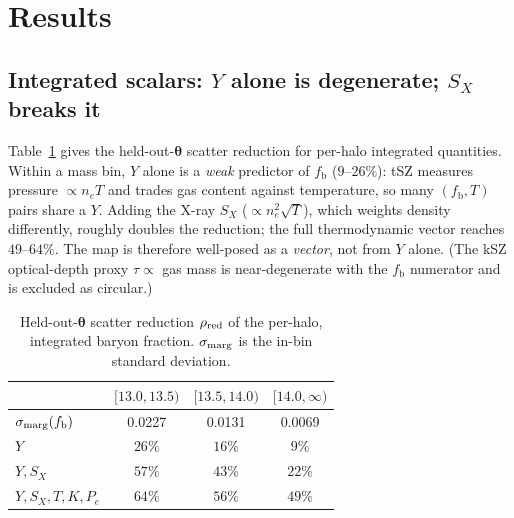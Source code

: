 \documentclass[11pt]{article}
\newcommand{\fb}{f_{\mathrm{b}}}
\newcommand{\Ysz}{Y}
\newcommand{\Sx}{S_X}
\newcommand{\thetav}{\bm{\theta}}
\begin{document}
\section{Results}
\label{sec:results}

\subsection{Integrated scalars: $\Ysz$ alone is degenerate; $\Sx$ breaks it}
\label{sec:scalar}
Table~\ref{tab:scalar} gives the held-out-$\thetav$ scatter reduction for per-halo
integrated quantities. Within a mass bin, $\Ysz$ alone is a \emph{weak} predictor of
$\fb$ ($9\text{--}26\%$): tSZ measures pressure $\propto n_eT$ and trades gas content
against temperature, so many $(\fb,T)$ pairs share a $\Ysz$. Adding the X-ray $\Sx$
($\propto n_e^2\sqrt{T}$), which weights density differently, roughly doubles the
reduction; the full thermodynamic vector reaches $49\text{--}64\%$. The map is
therefore well-posed as a \emph{vector}, not from $\Ysz$ alone. (The kSZ optical-depth
proxy $\tau\propto$ gas mass is near-degenerate with the $\fb$ numerator and is
excluded as circular.)

\begin{table}[t]
\centering
\caption{Held-out-$\thetav$ scatter reduction $\rho_{\rm red}$ of the per-halo,
integrated baryon fraction. $\sigma_{\rm marg}$ is the in-bin standard deviation.}
\label{tab:scalar}
\begin{tabular}{lccc}
\toprule
& $[13.0,13.5)$ & $[13.5,14.0)$ & $[14.0,\infty)$ \\
\midrule
$\sigma_{\rm marg}(\fb)$ & 0.0227 & 0.0131 & 0.0069 \\
\midrule
$\Ysz$               & $26\%$ & $16\%$ & $9\%$ \\
$\Ysz,\Sx$           & $57\%$ & $43\%$ & $22\%$ \\
$\Ysz,\Sx,T,K,P_e$   & $64\%$ & $56\%$ & $49\%$ \\
\bottomrule
\end{tabular}
\end{table}
\end{document}
